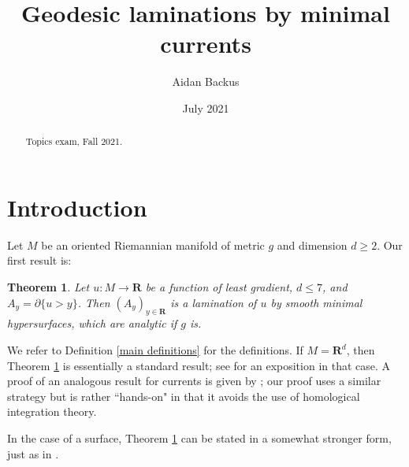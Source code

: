 \documentclass[reqno,12pt,letterpaper]{amsart}
\title[Geodesic laminations by minimal currents]{Geodesic laminations by minimal currents}
\author{Aidan Backus}
\date{July 2021}
\newcommand{\RR}{\mathbf{R}}
\newtheorem{theorem}{Theorem}[section]
\theoremstyle{definition}
\numberwithin{equation}{section}
\begin{document}
\begin{abstract}
Topics exam, Fall 2021.
\end{abstract}

\maketitle



\section{Introduction}
Let $M$ be an oriented Riemannian manifold of metric $g$ and dimension $d \geq 2$.
Our first result is:

\begin{theorem}\label{main thm}
Let $u: M \to \RR$ be a function of least gradient, $d \leq 7$, and $A_y = \partial \{u > y\}$.
Then $(A_y)_{y \in \RR}$ is a lamination of $u$ by smooth minimal hypersurfaces, which are analytic if $g$ is.
\end{theorem}

We refer to Definition \ref{main definitions} for the definitions.
If $M = \RR^d$, then Theorem \ref{main thm} is essentially a standard result; see \cite[Proposition 3.4]{górny2017planar} for an exposition in that case.
A proof of an analogous result for currents is given by \cite[\S5.3]{federer2014geometric}; our proof uses a similar strategy but is rather ``hands-on" in that it avoids the use of homological integration theory.

In the case of a surface, Theorem \ref{main thm} can be stated in a somewhat stronger form, just as in \cite[Corollary 3.5]{górny2017planar}.
\end{document}
